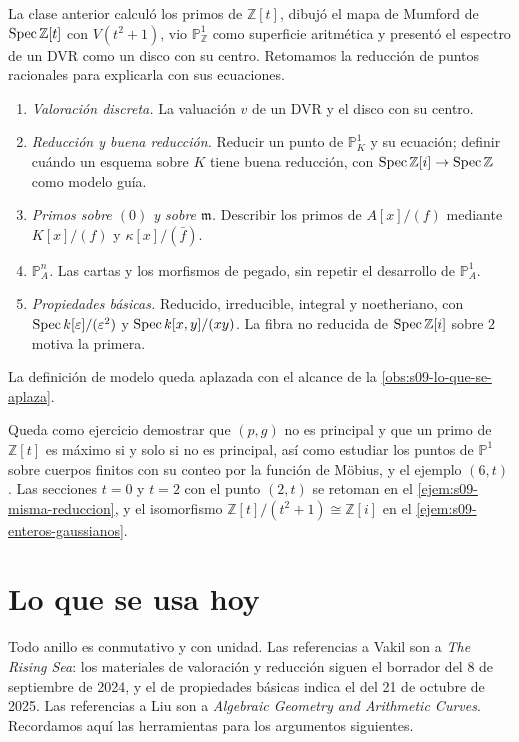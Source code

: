La clase anterior calculó los primos de $\mathbb Z[t]$, dibujó el mapa de Mumford de $\operatorname{Spec}\mathbb Z[t]$ con $V(t^2+1)$, vio $\mathbb P^1_{\mathbb Z}$ como superficie aritmética y presentó el espectro de un DVR como un disco con su centro. Retomamos la reducción de puntos racionales para explicarla con sus ecuaciones.

\begin{obs}
\label{obs:s09-objetivos}
\begin{enumerate}
\item \emph{Valoración discreta.} La valuación $v$ de un DVR y el disco con su centro.
\item \emph{Reducción y buena reducción.} Reducir un punto de $\mathbb P^1_K$ y su ecuación; definir cuándo un esquema sobre $K$ tiene buena reducción, con $\operatorname{Spec}\mathbb Z[i]\to\operatorname{Spec}\mathbb Z$ como modelo guía.
\item \emph{Primos sobre $(0)$ y sobre $\mathfrak m$.} Describir los primos de $A[x]/(f)$ mediante $K[x]/(f)$ y $\kappa[x]/(\bar f)$.
\item \emph{$\mathbb P^n_A$.} Las cartas y los morfismos de pegado, sin repetir el desarrollo de $\mathbb P^1_A$.
\item \emph{Propiedades básicas.} Reducido, irreducible, integral y noetheriano, con $\operatorname{Spec} k[\varepsilon]/(\varepsilon^2)$ y $\operatorname{Spec} k[x,y]/(xy)$. La fibra no reducida de $\operatorname{Spec}\mathbb Z[i]$ sobre $2$ motiva la primera.
\end{enumerate}
La definición de modelo queda aplazada con el alcance de la \cref{obs:s09-lo-que-se-aplaza}.
\end{obs}

\begin{obs}
\label{obs:s09-ejercicios-repaso}
Queda como ejercicio demostrar que $(p,g)$ no es principal y que un primo de $\mathbb Z[t]$ es máximo si y solo si no es principal, así como estudiar los puntos de $\mathbb P^1$ sobre cuerpos finitos con su conteo por la función de Möbius, y el ejemplo $(6,t)$. Las secciones $t=0$ y $t=2$ con el punto $(2,t)$ se retoman en el \cref{ejem:s09-misma-reduccion}, y el isomorfismo $\mathbb Z[t]/(t^2+1)\cong\mathbb Z[i]$ en el \cref{ejem:s09-enteros-gaussianos}.
\end{obs}

\section{Lo que se usa hoy}
Todo anillo es conmutativo y con unidad. Las referencias a Vakil son a \emph{The Rising Sea}: los materiales de valoración y reducción siguen el borrador del 8 de septiembre de 2024, y el de propiedades básicas indica el del 21 de octubre de 2025. Las referencias a Liu son a \emph{Algebraic Geometry and Arithmetic Curves}. Recordamos aquí las herramientas para los argumentos siguientes.

